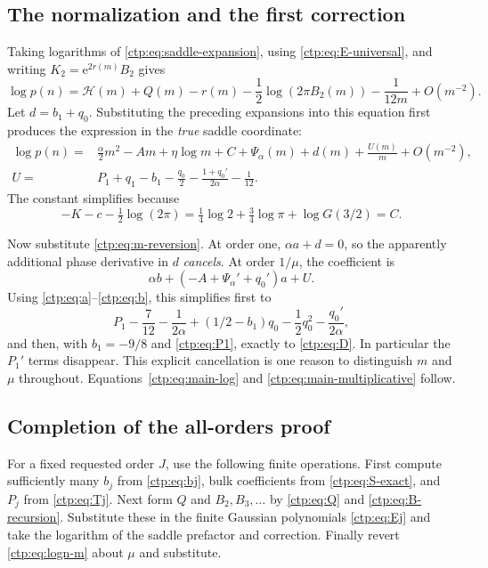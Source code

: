 \documentclass[11pt,a4paper]{article}
\numberwithin{equation}{section}
\theoremstyle{definition}
\theoremstyle{remark}
\newcommand{\e}{\mathrm e}
\newcommand{\HH}{\mathcal H}
\begin{document}
\subsection{The normalization and the first correction}
Taking logarithms of \eqref{ctp:eq:saddle-expansion}, using
\eqref{ctp:eq:E-universal}, and writing $K_2=\e^{2r(m)}B_2$ gives
\begin{equation}\label{ctp:eq:logp-saddle}
 \log p(n)=\HH(m)+Q(m)-r(m)-\frac12\log(2\pi B_2(m))
 -\frac1{12m}+O(m^{-2}).
\end{equation}
Let $d=b_1+q_0$. Substituting the preceding expansions into this equation
first produces the expression in the \emph{true} saddle coordinate:
\begin{align}
 \log p(n)={}&\frac\alpha2m^2-Am+\eta\log m+C+
 \Psi_\alpha(m)+d(m)+\frac{U(m)}m+O(m^{-2}),\label{ctp:eq:logp-m}\\
 U={}&P_1+q_1-b_1-\frac{q_0}{2}
 -\frac{1+q_0'}{2\alpha}-\frac1{12}.
 \label{ctp:eq:U}
\end{align}
The constant simplifies because
\[
 -K-c-\tfrac12\log(2\pi)
 =\tfrac14\log2+\tfrac34\log\pi+\log G(3/2)=C.
\]

Now substitute \eqref{ctp:eq:m-reversion}. At order one,
$\alpha a+d=0$, so the apparently additional phase derivative in $d$
\emph{cancels}. At order $1/\mu$, the coefficient is
\begin{equation}\label{ctp:eq:D-unsimplified}
 \alpha b+(-A+\Psi_\alpha'+q_0')a+U.
\end{equation}
Using \eqref{ctp:eq:a}--\eqref{ctp:eq:b}, this simplifies first to
\[
 P_1-\frac7{12}-\frac1{2\alpha}
 +(1/2-b_1)q_0-\frac12q_0^2-\frac{q_0'}{2\alpha},
\]
and then, with $b_1=-9/8$ and \eqref{ctp:eq:P1}, exactly to
\eqref{ctp:eq:D}. In particular the $P_1'$ terms disappear. This explicit
cancellation is one reason to distinguish $m$ and $\mu$ throughout.
Equations~\eqref{ctp:eq:main-log} and \eqref{ctp:eq:main-multiplicative} follow.

\subsection{Completion of the all-orders proof}
For a fixed requested order $J$, use the following finite operations.
First compute sufficiently many $b_j$ from \eqref{ctp:eq:bj}, bulk coefficients
from \eqref{ctp:eq:S-exact}, and $P_j$ from \eqref{ctp:eq:Tj}. Next form $Q$ and
$B_2,B_3,\ldots$ by \eqref{ctp:eq:Q} and \eqref{ctp:eq:B-recursion}. Substitute
these in the finite Gaussian polynomials \eqref{ctp:eq:Ej} and take the
logarithm of the saddle prefactor and correction. Finally revert
\eqref{ctp:eq:logn-m} about $\mu$ and substitute.
\end{document}
